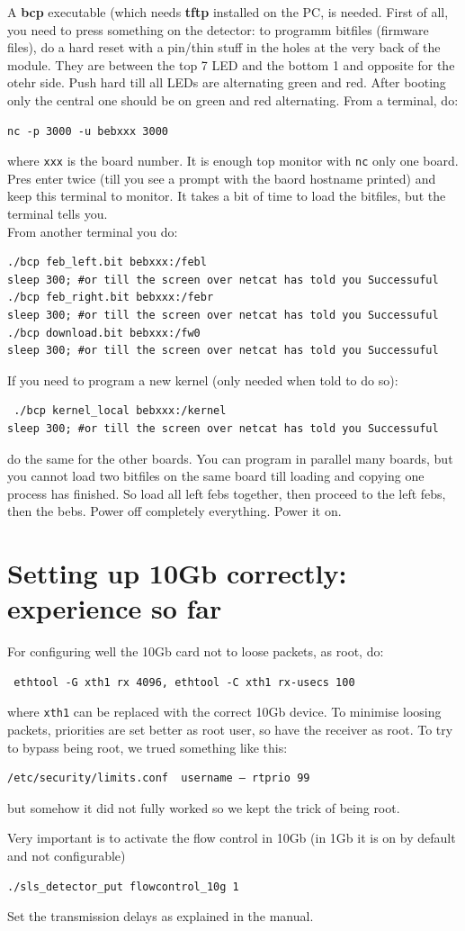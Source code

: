 \documentclass{article}
\begin{document}
A \textbf{bcp} executable (which needs \textbf{tftp} installed on the PC, is needed. First of all, you need to press something on the detector: to programm bitfiles (firmware files), do a hard reset with a pin/thin stuff in the holes at the very back of the module. They are between the top 7 LED and the bottom 1 and opposite for the otehr side. Push hard till all LEDs are alternating green and red. After booting only the central one should be on green and red alternating. From a terminal, do:
\begin{verbatim}
nc -p 3000 -u bebxxx 3000 
\end{verbatim} 
where {\tt{xxx}} is the board number. It is enough top monitor with {\tt{nc}} only one board. Pres enter twice (till you see a prompt with the baord hostname printed) and keep this terminal to monitor. It takes a bit of time to load the bitfiles, but the terminal tells you.\\
From another terminal you do:
\begin{verbatim}
./bcp feb_left.bit bebxxx:/febl
sleep 300; #or till the screen over netcat has told you Successuful
./bcp feb_right.bit bebxxx:/febr
sleep 300; #or till the screen over netcat has told you Successuful
./bcp download.bit bebxxx:/fw0
sleep 300; #or till the screen over netcat has told you Successuful
\end{verbatim}
If you need to program a new kernel (only needed when told to do so):
\begin{verbatim}
 ./bcp kernel_local bebxxx:/kernel
sleep 300; #or till the screen over netcat has told you Successuful
\end{verbatim}

do the same for the other boards. You can program in parallel many boards, but you cannot load two bitfiles on the same board till loading and copying one process has finished. So load all left febs together, then proceed to the left febs, then the bebs. Power off completely everything. Power it on.

\section{Setting up 10Gb correctly: experience so far}

For configuring well the 10Gb card not to loose packets, as root, do:
\begin{verbatim}
 ethtool -G xth1 rx 4096, ethtool -C xth1 rx-usecs 100 
\end{verbatim}
where {\tt{xth1}} can be replaced with the correct 10Gb device. To minimise loosing packets, priorities are set better as root user, so have the receiver as root.
To try to bypass being root, we trued something like this:
\begin{verbatim}
/etc/security/limits.conf  username – rtprio 99
\end{verbatim}
but somehow it did  not fully worked  so we kept the trick of being root.

Very important is to activate the flow control in 10Gb (in 1Gb it is on by default and not configurable)
\begin{verbatim}
./sls_detector_put flowcontrol_10g 1
\end{verbatim}
Set the transmission delays as explained in the manual.
\end{document}
